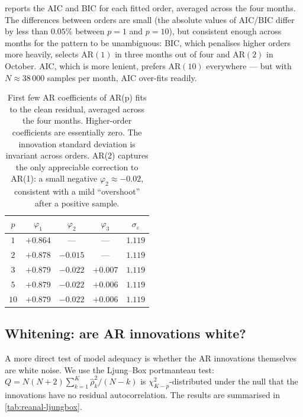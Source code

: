  reports the AIC and BIC for each fitted
order, averaged across the four months. The differences between
orders are small (the absolute values of AIC/BIC differ by less than
$0.05\%$ between $p = 1$ and $p = 10$), but consistent enough across
months for the pattern to be unambiguous: BIC, which penalises
higher orders more heavily, selects $\mathrm{AR}(1)$ in three months
out of four and $\mathrm{AR}(2)$ in October. AIC, which is more
lenient, prefers $\mathrm{AR}(10)$ everywhere --- but with
$N \approx 38\,000$ samples per month, AIC over-fits readily.

\begin{table}[H]
    \centering
    \footnotesize
    \begin{tabular}{ccccc}
        \toprule
        $p$ & $\varphi_1$ & $\varphi_2$ & $\varphi_3$ & $\sigma_\varepsilon$ \\
        \midrule
        $1$  & $+0.864$ & ---      & ---      & $1.119$ \\
        $2$  & $+0.878$ & $-0.015$ & ---      & $1.119$ \\
        $3$  & $+0.879$ & $-0.022$ & $+0.007$ & $1.119$ \\
        $5$  & $+0.879$ & $-0.022$ & $+0.006$ & $1.119$ \\
        $10$ & $+0.879$ & $-0.022$ & $+0.006$ & $1.119$ \\
        \bottomrule
    \end{tabular}
    \caption{First few AR coefficients of AR(p) fits to the clean
    residual, averaged across the four months. Higher-order
    coefficients are essentially zero. The innovation standard
    deviation is invariant across orders. AR(2) captures the only
    appreciable correction to AR(1): a small negative
    $\varphi_2 \approx -0.02$, consistent with a mild ``overshoot''
    after a positive sample.}
    \label{tab:reanal-ar-order}
\end{table}

\subsection{Whitening: are AR innovations white?}
\label{sec:reanal-whitening}

A more direct test of model adequacy is whether the AR innovations
themselves are white noise. We use the Ljung--Box portmanteau test:
$Q = N(N + 2) \sum_{k=1}^{K} \hat{\rho}_k^2 / (N - k)$ is
$\chi^2_{K - p}$-distributed under the null that the innovations have
no residual autocorrelation. The results are summarised in
\cref{tab:reanal-ljungbox}.

